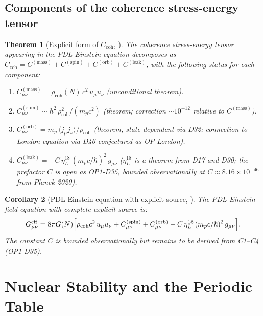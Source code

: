 \documentclass[11pt,a4paper]{article}
\theoremstyle{plain}
\newtheorem{theorem}{Theorem}[section]
\newtheorem{corollary}[theorem]{Corollary}
\theoremstyle{definition}
\theoremstyle{remark}
\newcommand{\rhocoh}{\rho_{\mathrm{coh}}}
\newcommand{\Ccoh}{C_{\mathrm{coh}}}
\begin{document}
\subsection{Components of the coherence stress-energy tensor}
\label{subsec:Ccohcomponents}
\begin{theorem}[Explicit form of $\Ccoh$, \cite{D48}]
\label{thm:Ccoh}
The coherence stress-energy tensor appearing in the PDL Einstein equation decomposes as $\Ccoh = C^{(\mathrm{mass})} + C^{(\mathrm{spin})} + C^{(\mathrm{orb})} + C^{(\mathrm{leak})}$, with the following status for each component:
\begin{enumerate}
\item $C^{(\mathrm{mass})}_{\mu\nu} = \rhocoh(N)\,c^2\,u_\mu u_\nu$ \quad (\textcolor{proofblue}{unconditional theorem}).
\item $C^{(\mathrm{spin})}_{\mu\nu} \sim \hbar^2\,\rhocoh^2/(m_p c^2)$ \quad (\textcolor{proofblue}{theorem}; correction $\sim 10^{-12}$ relative to $C^{(\mathrm{mass})}$).
\item $C^{(\mathrm{orb})}_{\mu\nu} = m_p\,\langle j_\mu j_\nu\rangle/\rhocoh$ \quad (\textcolor{proofblue}{theorem}, state-dependent via D32; connection to London equation via D46 conjectured as OP-London).
\item $C^{(\mathrm{leak})}_{\mu\nu} = -C\,\eta_L^{18}\,(m_p c/\hbar)^2\,g_{\mu\nu}$ \quad ($\eta_L^{18}$ is a \textcolor{proofblue}{theorem} from D17 and D30; the prefactor $C$ is \textcolor{openproblemred}{open} as OP1-D35, bounded observationally at $C \approx 8.16\times10^{-46}$ from Planck 2020).
\end{enumerate}
\end{theorem}

\begin{corollary}[PDL Einstein equation with explicit source, \cite{D48}]
\label{cor:EinsteinExplicit}
The PDL Einstein field equation with complete explicit source is:
\begin{equation}
G_{\mu\nu}^{\mathrm{eff}} = 8\pi G(N)\Bigl[\rhocoh c^2\,u_\mu u_\nu + C^{(\mathrm{spin})}_{\mu\nu} + C^{(\mathrm{orb})}_{\mu\nu} - C\,\eta_L^{18}\,(m_p c/\hbar)^2\,g_{\mu\nu}\Bigr].
\end{equation}
The constant $C$ is bounded observationally but remains to be derived from C1--C4 (OP1-D35).
\end{corollary}

\section{Nuclear Stability and the Periodic Table}
\label{sec:nuclear}
\end{document}
